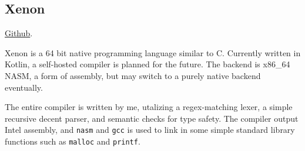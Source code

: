 \documentclass[10pt,letterpaper]{article}
\def\code#1{\texttt{#1}}
\begin{document}
    \subsection*{Xenon}
    \href{https://github.com/Mee42/Xenon}{Github}.
    
    Xenon is a 64 bit native programming language similar to C.
    Currently written in Kotlin, a self-hosted compiler is planned for the future.
    The backend is x86\_64 NASM, a form of assembly,
    but may switch to a purely native backend eventually.
    
    The entire compiler is written by me, utalizing a regex-matching lexer, 
    a simple recursive decent parser,
    and semantic checks for type safety.
    The compiler output Intel assembly,
    and \code{nasm} and \code{gcc} is used to link in some simple standard library functions such as
    \code{malloc} and \code{printf}.
\end{document}

